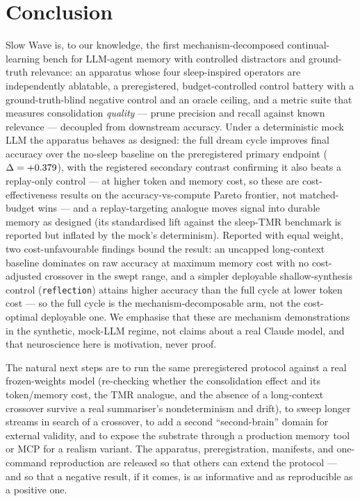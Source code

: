 \section{Conclusion}\label{sec:conclusion}

Slow Wave is, to our knowledge, the first mechanism-decomposed continual-learning
bench for LLM-agent memory with controlled distractors and ground-truth
relevance: an apparatus whose four sleep-inspired operators are independently
ablatable, a preregistered, budget-controlled control battery with a
ground-truth-blind negative control and an oracle ceiling, and a metric suite
that measures consolidation \emph{quality} --- prune precision and recall against
known relevance --- decoupled from downstream accuracy. Under a deterministic
mock LLM the apparatus behaves as designed: the full dream cycle improves final
accuracy over the no-sleep baseline on the preregistered primary endpoint
($\Delta=+0.379$), with the registered secondary contrast confirming it
also beats a replay-only control --- at higher token and memory cost, so these are
cost-effectiveness results on the accuracy-vs-compute Pareto frontier, not
matched-budget wins --- and a replay-targeting analogue moves signal into durable
memory as designed (its standardised lift against the sleep-TMR benchmark is
reported but inflated by the mock's determinism). Reported with equal weight, two
cost-unfavourable findings bound the result: an uncapped long-context baseline
dominates on raw accuracy at maximum memory cost with no cost-adjusted crossover in the
swept range, and a simpler deployable shallow-synthesis control
(\texttt{reflection}) attains higher accuracy than the full cycle at lower token
cost --- so the full cycle is the mechanism-decomposable arm, not the cost-optimal
deployable one. We emphasise that these are mechanism
demonstrations in the synthetic, mock-LLM regime, not claims about a real Claude
model, and that neuroscience here is motivation, never proof.

The natural next steps are to run the same preregistered protocol against a real
frozen-weights model (re-checking whether the consolidation effect and its
token/memory cost, the TMR
analogue, and the absence of a long-context crossover survive a real
summariser's nondeterminism and drift), to sweep longer streams in search of a
crossover, to add a second ``second-brain'' domain for external validity, and to
expose the substrate through a production memory tool or MCP for a realism
variant. The apparatus, preregistration, manifests, and one-command reproduction
are released so that others can extend the protocol --- and so that a negative
result, if it comes, is as informative and as reproducible as a positive one.
